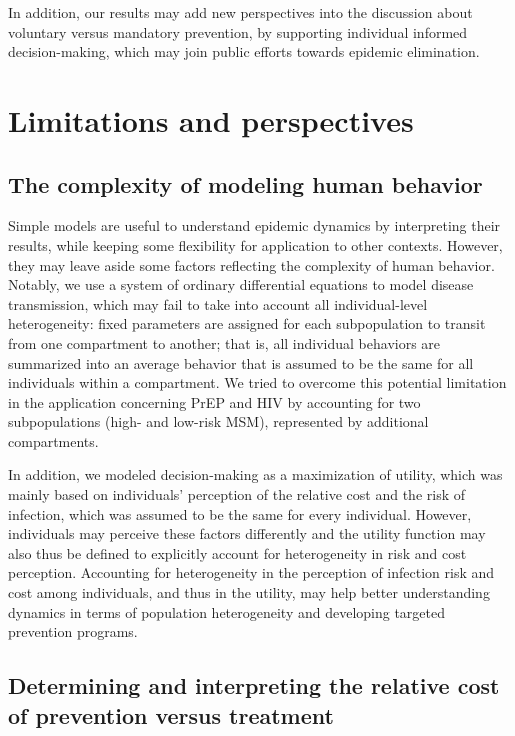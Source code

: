 In addition, our results may add new perspectives into the discussion about voluntary versus mandatory prevention, by supporting individual informed decision-making, which may join public efforts towards epidemic elimination.

\section{Limitations and perspectives}

\subsection{The complexity of modeling human behavior}
Simple models are useful to understand epidemic dynamics by interpreting their results, while keeping some flexibility for application to other contexts. However, they may leave aside some factors reflecting the complexity of human behavior. Notably, we use a system of ordinary differential equations to model disease transmission, which may fail to take into account all individual-level heterogeneity: fixed parameters are assigned for each subpopulation to transit from one compartment to another; that is, all individual behaviors are summarized into an average behavior that is assumed to be the same for all individuals within a compartment. We tried to overcome this potential limitation in the application concerning PrEP and HIV by accounting for two subpopulations (high- and low-risk MSM), represented by additional compartments. 

In addition, we modeled decision-making as a maximization of utility, which was mainly based on individuals' perception of the relative cost and the risk of infection, which was assumed to be the same for every individual. However, individuals may perceive these factors differently and the utility function may also thus be defined to explicitly account for heterogeneity in risk and cost perception. Accounting for heterogeneity in the perception of infection risk and cost among individuals, and thus in the utility, may help better understanding dynamics in terms of population heterogeneity and developing targeted prevention programs.

\subsection{Determining and interpreting the relative cost of prevention versus treatment}

